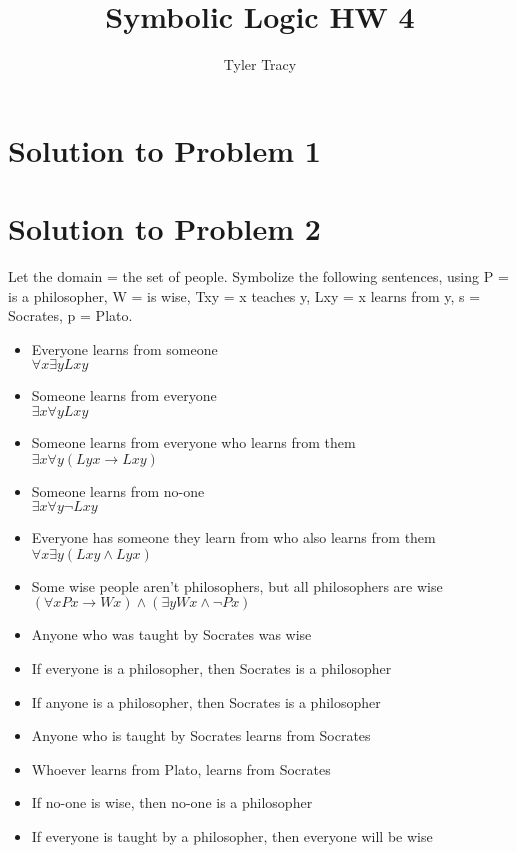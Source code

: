 \documentclass[12pt]{article}
\title{Symbolic Logic HW 4}
\author{Tyler Tracy}
\begin{document}
\section*{Solution to Problem 1}

\section*{Solution to Problem 2}

Let the domain = the set of people. Symbolize the following sentences, using P = is a philosopher, W = is wise, Txy = x teaches y, Lxy = x learns from y, s = Socrates, p = Plato. 

\begin{itemize}
    \item Everyone learns from someone \\
        $\forall x \exists y Lxy$
    \item Someone learns from everyone \\
        $\exists x \forall y Lxy$
    \item Someone learns from everyone who learns from them \\
        $\exists x \forall y (Lyx \rightarrow Lxy)$
    \item Someone learns from no-one \\
        $\exists x \forall y \neg Lxy$
    \item Everyone has someone they learn from who also learns from them \\
        $\forall x \exists y (Lxy \land Lyx) $
    \item Some wise people aren’t philosophers, but all philosophers are wise \\
        $(\forall x Px \rightarrow Wx) \land (\exists y Wx \land \lnot Px)$
    \item Anyone who was taught by Socrates was wise  
    \item If everyone is a philosopher, then Socrates is a philosopher 
    \item If anyone is a philosopher, then Socrates is a philosopher 
    \item Anyone who is taught by Socrates learns from Socrates 
    \item Whoever learns from Plato, learns from Socrates 
    \item If no-one is wise, then no-one is a philosopher 
    \item If everyone is taught by a philosopher, then everyone will be wise
\end{itemize}
\end{document}
